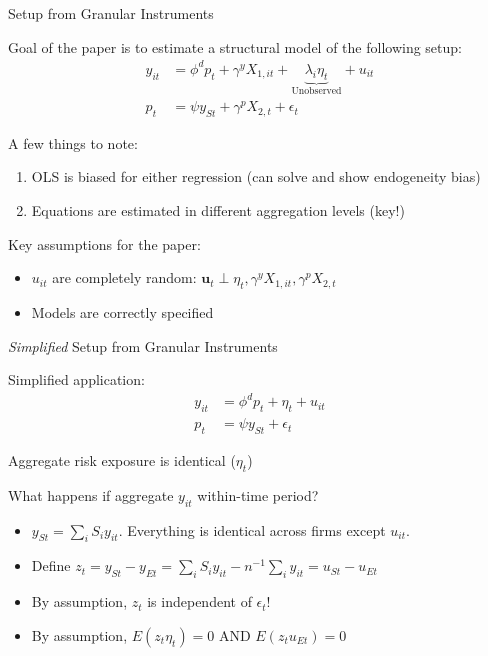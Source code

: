 \documentclass[notes,11pt, aspectratio=169]{beamer}
\newenvironment{wideitemize}{\itemize\addtolength{\itemsep}{10pt}}{\enditemize}
\begin{document}
\begin{frame}{ Setup from Granular Instruments}
  \begin{wideitemize}
  \item Goal of the paper is to estimate a structural model of the following setup:
    \begin{align}
      y_{it} &= \phi^{d}p_{t} + \gamma^{y} X_{1,it} + \underbrace{\lambda_{i}\eta_{t}}_{\text{Unobserved}} + u_{it}\\
      p_{t}  &= \psi y_{St} + \gamma^{p} X_{2,t} + \epsilon_{t}
    \end{align}
  \item A few things to note:
    \begin{enumerate}
    \item OLS is biased for either regression (can solve and show endogeneity bias)
    \item Equations are estimated in different aggregation levels (key!)
    \end{enumerate}
  \item Key assumptions for the paper:
    \begin{itemize}
    \item $u_{it}$ are completely random: $\boldsymbol{u}_{t} \perp \eta_{t},\gamma^{y} X_{1,it}, \gamma^{p} X_{2,t}$
    \item Models are correctly specified
    \end{itemize}
  \end{wideitemize}
\end{frame}

\begin{frame}{\emph{Simplified} Setup from Granular Instruments}
  \begin{wideitemize}
  \item Simplified application:
    \begin{align}
      y_{it} &= \phi^{d}p_{t} + \eta_{t} + u_{it}\\
      p_{t}  &= \psi y_{St} + \epsilon_{t}
    \end{align}
  \item Aggregate risk exposure is identical ($\eta_{t}$)
  \item What happens if aggregate $y_{it}$ within-time period?
    \begin{itemize}
    \item $y_{S t} = \sum_{i}S_{i}y_{it}$. Everything is
      identical across firms except $u_{it}$.
    \item Define $z_{t} = y_{S t} - y_{E t} = \sum_{i}S_{i}y_{it} - n^{-1}\sum_{i}y_{it} = u_{St} - u_{Et}$
    \item By assumption, $z_{t}$ is independent of $\epsilon_{t}$! 
    \item By assumption, $E(z_{t}\eta_{t}) = 0$  AND $E(z_{t}u_{Et}) = 0$      
    \end{itemize}
  \end{wideitemize}
\end{frame}
\end{document}
